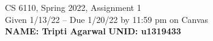 \documentclass[10pt]{article}
\begin{document}



\begin{center}
\begin{large}
  CS 6110, Spring 2022, Assignment 1  \\
  Given 1/13/22 -- Due 1/20/22 by 11:59 pm on Canvas
  \ \\
      {  {\Large\bf NAME: Tripti Agarwal} \hfill {\Large\bf UNID: u1319433}\hspace{4cm} }
\end{large}
\end{center}
 

\date{}



%



\end{document}
